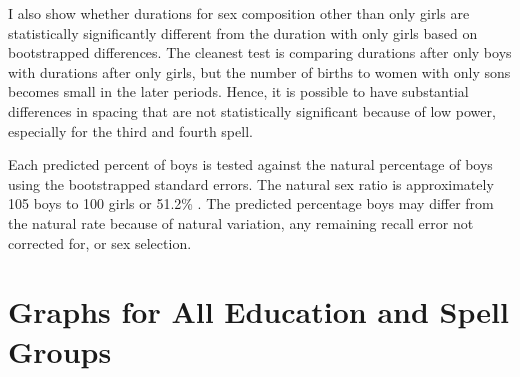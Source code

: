 \documentclass[12pt,letterpaper]{article}
\begin{document}
I also show whether durations for sex composition other than only girls are statistically 
significantly different from the duration with only girls based on bootstrapped 
differences. 
The cleanest test is comparing durations after only boys with durations after
only girls, but the number of births to women with only sons becomes small 
in the later periods.
Hence, it is possible to have substantial differences in spacing that are
not statistically significant because of low power, especially for the third 
and fourth spell.

Each predicted percent of boys is tested against the natural percentage of
boys using the bootstrapped standard errors.
The natural sex ratio is approximately 105 boys to 100 girls or
51.2\% \citep{ben-porath76b,jacobsen99,Portner2015b}.
The predicted percentage boys may differ from the natural rate because of 
natural variation, any remaining recall error not corrected for, or 
sex selection. 















\clearpage
\newpage


\section{Graphs for All Education and Spell Groups}

\setcounter{figure}{0}
\setcounter{table}{0}



% 
% 
% 
% 
% 
% 
% 
% 
% 
% 
\end{document}
